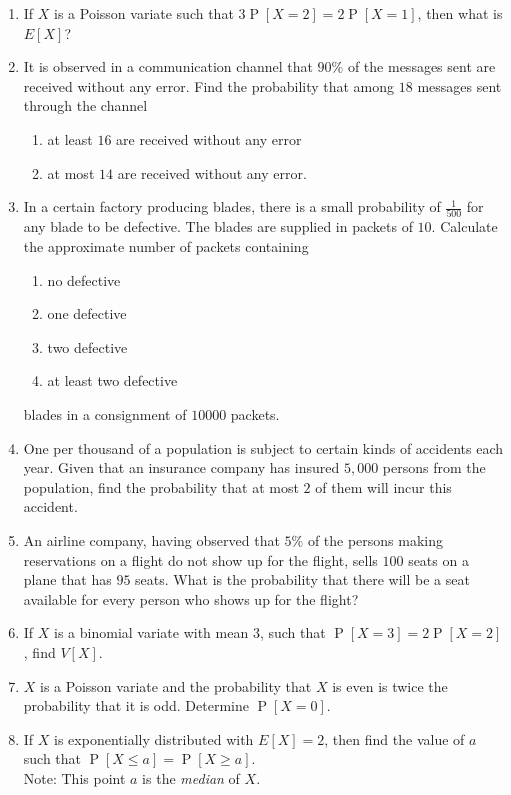 \documentclass[svgnames]{amsart}
\DeclareMathOperator{\Prob}{P}
\begin{document}
\begin{enumerate}[leftmargin=*, itemsep=0.3em]
\item If $X$ is a Poisson variate such that $3 \Prob[X = 2] = 2\Prob[X = 1]$, then what is $E[X]$?

\item  It is observed in a communication channel that $90\%$ of the messages sent are received without any error. Find the probability that among $18$ messages sent through the channel
\begin{enumerate}[label=(\roman*)]
	\item at least $16$ are received without any error
	\item at most $14$ are received without any error.
\end{enumerate}

\item In a certain factory producing blades, there is a small probability of $\frac{1}{500}$ for any blade to be defective. The blades are supplied in packets of $10$. Calculate the approximate number of packets containing
\begin{enumerate}[label=(\roman*)]
	\item no defective
	\item one defective
	\item two defective
	\item at least two defective
\end{enumerate}
blades in a consignment of $10000$ packets.

\item One per thousand of a population is subject to certain kinds of accidents each year. Given that an insurance company has insured $5,000$ persons from the population, find the probability that at most $2$ of them will incur this accident.

\item An airline company, having observed that $5\%$ of the persons making reservations on a flight do not show up for the flight, sells $100$ seats on a plane that has $95$ seats. What is the probability that there will be a seat available for every person who shows up for the flight?

\item If $X$ is a binomial variate with mean $3$, such that $\Prob[X = 3] = 2\Prob[X = 2]$, find $V[X]$.

\item $X$ is a Poisson variate and the probability that $X$ is even is twice the probability that it is odd. Determine $\Prob[X = 0]$.

\item  If $X$ is exponentially distributed with $E[X] = 2$, then find the value of $a$ such that $\Prob[X \le a] = \Prob[X \ge a]$.\\
{\small\color{blue!40!black}
		Note: This point $a$ is the \emph{median} of $X$.
}


\end{enumerate}
\end{document}
